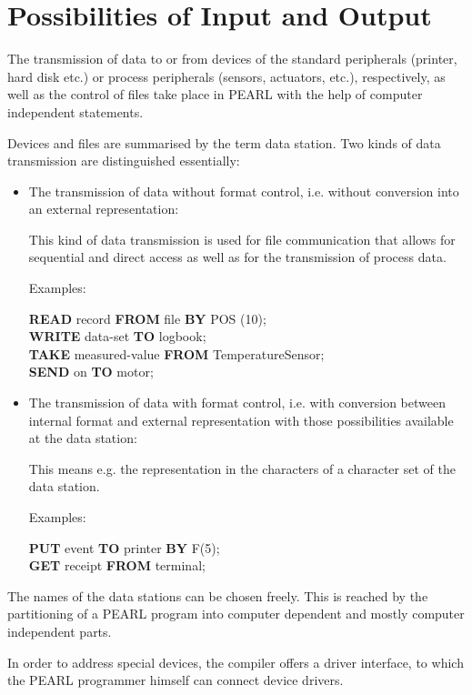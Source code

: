 \section{Possibilities of Input and Output}   %

The transmission of data to or from devices of the standard peripherals (printer, hard disk etc.) 
or process peripherals (sensors, 
actuators, etc.), respectively, as well as the control of files take place in PEARL with 
the help of computer independent statements.

Devices and files are summarised by the term data station. Two kinds of
data transmission are distinguished essentially:

\begin{itemize}
\item The transmission of data without format control, i.e. without
      conversion into an external representation:

      This kind of data transmission is used for file communication that
      allows for sequential and direct access as well as for the transmission
      of process data.

      Examples:

      {\bf READ} record {\bf FROM} file {\bf BY} POS (10);\\
      {\bf WRITE} data-set {\bf TO} logbook;\\
      {\bf TAKE} measured-value {\bf FROM} TemperatureSensor;\\
      {\bf SEND} on {\bf TO} motor;

\item The transmission of data with format control, i.e. with conversion
      between internal format and external representation with those
      possibilities available at the data station:

      This means e.g. the representation in the characters of a character set
      of the data station.

      Examples:

      {\bf PUT} event {\bf TO} printer {\bf BY} F(5);\\
      {\bf GET} receipt {\bf FROM} terminal;
\end{itemize}

The names of the data stations can be chosen freely. This is reached by the
partitioning of a PEARL program into computer dependent and mostly
computer independent parts.

In order to address special devices, the compiler offers a driver
interface, to which the PEARL programmer himself can connect device
drivers.

